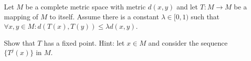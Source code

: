 Let $M$ be a complete metric space with metric $d(x,y)$ and let
$T:M\rightarrow M$ be a mapping of $M$ to itself. Assume there is a
constant $\lambda\in [0,1)$ such that $\forall x,y\in
M:d(T(x),T(y))\leq \lambda d(x,y)$. 

Show that $T$ has a fixed point. Hint: let $x\in M$ and consider the
sequence $\{T^j(x)\}$ in $M$.
